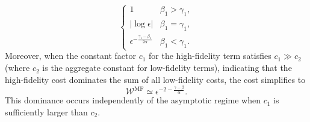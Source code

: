 \begin{theorem}
\begin{equation}
\begin{cases}
1 & \beta_1 > \gamma_1, \\
|\log \epsilon| & \beta_1 = \gamma_1, \\
\epsilon^{-\frac{\gamma_1 - \beta_1}{2\alpha}} & \beta_1 < \gamma_1.
\end{cases}
\end{equation}
%
Moreover, when the constant factor $c_1$ for the high-fidelity term satisfies $c_1 \gg c_2$ (where $c_2$ is the aggregate constant for low-fidelity terms), indicating that the high-fidelity cost dominates the sum of all low-fidelity costs, the cost simplifies to
%
\[
\mathcal{W}^{\mathrm{MF}} \simeq \epsilon^{-2 - \frac{\gamma-\beta}{\alpha}}.
\]
%
This dominance occurs independently of the asymptotic regime when $c_1$ is sufficiently larger than $c_2$.
\end{theorem}










